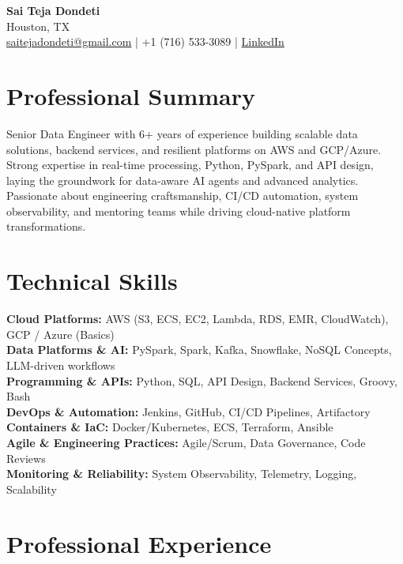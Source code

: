 \documentclass[10pt]{article}
\begin{document}
\begin{center}
    {\LARGE \textbf{Sai Teja Dondeti}} \\
    \vspace{2pt}
    Houston, TX \\
    \href{mailto:saitejadondeti@gmail.com}{saitejadondeti@gmail.com} \;|\;
    +1 (716) 533-3089 \;|\;
    \href{https://www.linkedin.com/in/sai-teja-dondeti/}{LinkedIn}
\end{center}

\section*{Professional Summary}
Senior Data Engineer with 6+ years of experience building scalable data solutions, backend services, and resilient platforms on AWS and GCP/Azure. Strong expertise in real-time processing, Python, PySpark, and API design, laying the groundwork for data-aware AI agents and advanced analytics. Passionate about engineering craftsmanship, CI/CD automation, system observability, and mentoring teams while driving cloud-native platform transformations.

\section*{Technical Skills}

\textbf{Cloud Platforms:} AWS (S3, ECS, EC2, Lambda, RDS, EMR, CloudWatch), GCP / Azure (Basics) \\
\textbf{Data Platforms \& AI:} PySpark, Spark, Kafka, Snowflake, NoSQL Concepts, LLM-driven workflows \\
\textbf{Programming \& APIs:} Python, SQL, API Design, Backend Services, Groovy, Bash \\
\textbf{DevOps \& Automation:} Jenkins, GitHub, CI/CD Pipelines, Artifactory \\
\textbf{Containers \& IaC:} Docker/Kubernetes, ECS, Terraform, Ansible \\
\textbf{Agile \& Engineering Practices:} Agile/Scrum, Data Governance, Code Reviews \\
\textbf{Monitoring \& Reliability:} System Observability, Telemetry, Logging, Scalability

\section*{Professional Experience}
\end{document}
